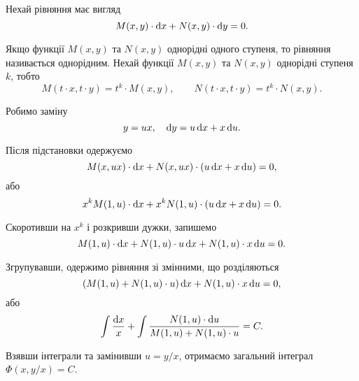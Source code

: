 Нехай рівняння має вигляд
\begin{equation*}
	M(x, y) \cdot \mathop{}\!\mathrm{d}	x + N(x, y) \cdot \mathop{}\!\mathrm{d} y = 0.
\end{equation*}

Якщо функції $M(x, y)$ та $N(x, y)$ однорідні одного ступеня, то рівняння називається однорідним. Нехай функції $M(x, y)$ та $N(x, y)$ однорідні ступеня $k$, тобто
\begin{equation*}
	M(t \cdot x, t \cdot y) = t^k \cdot M(x, y), \qquad N(t \cdot x, t \cdot y) = t^k \cdot N(x, y).
\end{equation*}

Робимо заміну 
\begin{equation*}
	y = u x, \quad \mathop{}\!\mathrm{d} y = u \mathop{}\!\mathrm{d} x + x \mathop{}\!\mathrm{d} u.
\end{equation*}

Після підстановки одержуємо
\begin{equation*}
	M(x, u x) \cdot \mathop{}\!\mathrm{d} x + N(x, u x) \cdot (u \mathop{}\!\mathrm{d} x + x \mathop{}\!\mathrm{d} u) = 0,
\end{equation*}
або 
\begin{equation*}
	x^k M(1, u) \cdot \mathop{}\!\mathrm{d} x + x^k N(1, u) \cdot (u \mathop{}\!\mathrm{d} x + x \mathop{}\!\mathrm{d} u) = 0.
\end{equation*}

Скоротивши на $x^k$ і розкривши дужки, запишемо 
\begin{equation*}
	M(1, u) \cdot \mathop{}\!\mathrm{d} x + N(1, u) \cdot u \mathop{}\!\mathrm{d} x + N(1, u) \cdot x \mathop{}\!\mathrm{d} u = 0.
\end{equation*}

Згрупувавши, одержимо рівняння зі змінними, що розділяються
\begin{equation*}
	(M(1, u) + N(1, u) \cdot u) \mathop{}\!\mathrm{d} x + N(1, u) \cdot x \mathop{}\!\mathrm{d} u = 0,
\end{equation*}
або 
\begin{equation*}
	\int \frac{\mathop{}\!\mathrm{d} x}{x} + \int \frac{N(1, u) \cdot \mathop{}\!\mathrm{d} u}{M(1, u) + N(1, u) \cdot u} = C.
\end{equation*}

Взявши інтеграли та замінивши $u = y / x$, отримаємо загальний інтеграл $\Phi(x, y / x) = C$.